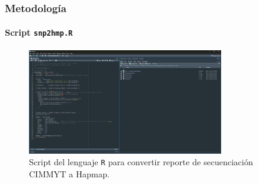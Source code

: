 \documentclass[9pt,aspectratio=169]{beamer}
\begin{document}
\begin{frame}
\frametitle{Metodología}
\framesubtitle{Script \texttt{snp2hmp.R}}

    \begin{figure}
        \centering
        \includegraphics[width = 0.75\textwidth]{scrip_snp2hmp.png}
        \caption{Script del lenguaje \texttt{R} para convertir reporte de secuenciación CIMMYT a Hapmap.}
        \label{fig:snp2hmp}
    \end{figure}
\end{frame}
\end{document}
